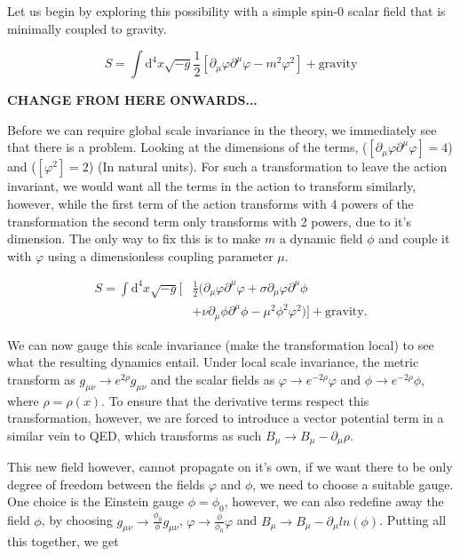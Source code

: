\documentclass[aps,prd,reprint,preprintnumbers,showpacs,floatfix,nofootinbib,superscript address]{revtex4-2}
\begin{document}
Let us begin by exploring this possibility with a simple spin-0 scalar field that is minimally coupled to gravity.

\begin{equation}
    S = \int \mathrm{d}^4 x \sqrt{-g} \frac{1}{2} \left[ \partial_\mu \varphi \partial^\mu \varphi - m^2   \varphi^2   \right] + \text{gravity}
\end{equation}

\textbf{CHANGE FROM HERE ONWARDS...}

Before we can require global scale invariance in the theory, we immediately see that there is a problem. Looking at the dimensions of the terms, ($[\partial_\mu \varphi \partial^\mu \varphi ] = 4$) and ($[\varphi^2 ] = 2$) (In natural units).  For such a transformation to leave the action invariant, we would want all the terms in the action to transform similarly, however, while the first term of the action transforms with 4 powers of the transformation the second term only transforms with 2 powers, due to it's dimension. The only way to fix this is to make $m$ a dynamic field $\phi$  and couple it with $\varphi$ using a dimensionless coupling parameter $\mu$.

\begin{subequations}\label{23}
\begin{align}
    S = \int \mathrm{d}^4 x \sqrt{-g} \bigg[ &\frac{1}{2} \Big( \partial_\mu \varphi \partial^\mu \varphi + \sigma \partial_\mu \varphi \partial^\mu \phi \nonumber\\
    &+ \nu \partial_\mu \phi \partial^\mu \phi - \mu^2 \phi^2 \varphi^2 \Big) \bigg] + \text{gravity}.
\end{align}
\end{subequations}

We can now gauge this scale invariance (make the transformation local) to see what the resulting dynamics entail. Under local scale invariance, the metric transform as $g_{\mu \nu} \rightarrow e^{2\rho} g_{\mu \nu}$ and the scalar fields as $\varphi \rightarrow e^{-2\rho} \varphi$ and $\phi \rightarrow e^{-2\rho} \phi$, where $\rho = \rho(x)$. To ensure that the derivative terms respect this transformation, however, we are forced to introduce a vector potential term in a similar vein to QED, which transforms as such $B_{\mu} \rightarrow B_{\mu} - \partial_{\mu}\rho$.

This new field however, cannot propagate on it's own, if we want there to be only degree of freedom between the fields $\varphi$ and $\phi$, we need to choose a suitable gauge. One choice is the Einstein gauge $\phi = \phi_{0}$, however, we can also redefine away the field $\phi$, by choosing $g_{\mu \nu} \rightarrow \frac{\phi_0}{\phi} g_{\mu \nu}$, $\varphi \rightarrow \frac{\phi}{\phi_0} \varphi$ and $B_{\mu} \rightarrow B_{\mu} - \partial_{\mu} ln(\phi)$. Putting all this together, we get
\end{document}
